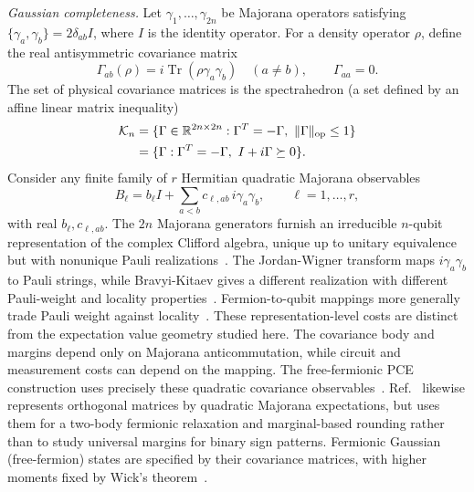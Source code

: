 \documentclass[10pt,aps,pra,twocolumn,superscriptaddress,nofootinbib,longbibliography]{revtex4-2}
\newcommand{\Tr}{\operatorname{Tr}}
\newcommand{\R}{\mathbb{R}}
\newcommand{\op}{\mathrm{op}}
\newcommand{\calK}{\mathcal{K}}
\begin{document}
\emph{Gaussian completeness.}
Let $\gamma_1,\ldots,\gamma_{2n}$ be Majorana operators satisfying $\{\gamma_a,\gamma_b\}=2\delta_{ab}I$, where $I$ is the identity operator.  For a density operator $\rho$, define the real antisymmetric covariance matrix
\begin{equation}
    \Gamma_{ab}(\rho)=i\Tr(\rho\gamma_a\gamma_b)\quad(a\ne b),
    \qquad \Gamma_{aa}=0.
    \label{eq:cov}
\end{equation}
The set of physical covariance matrices is the spectrahedron (a set defined by an affine linear matrix inequality)~\cite{RamanaGoldman1995SDP,Bravyi2005Lagrangian,Wan2023MatchgateShadows}
\begin{align}
    \calK_n
    &=\{\Gamma\in\R^{2n\times2n}:\Gamma^T=-\Gamma,\ \|\Gamma\|_{\op}\le1\}\notag\\
    &=\{\Gamma:\Gamma^T=-\Gamma,\ I+i\Gamma\succeq0\}.
    \label{eq:Kn}
\end{align}
Consider any finite family of $r$ Hermitian quadratic Majorana observables
\begin{equation}
    B_\ell=b_\ell I+\sum_{a<b}c_{\ell,ab}\,i\gamma_a\gamma_b,
    \qquad \ell=1,\ldots,r,
    \label{eq:quadratic-features}
\end{equation}
with real $b_\ell,c_{\ell,ab}$.  The $2n$ Majorana generators furnish an irreducible $n$-qubit representation of the complex Clifford algebra, unique up to unitary equivalence but with nonunique Pauli realizations~\cite{BravyiKitaev2002,Bravyi2005Lagrangian}.  The Jordan-Wigner transform maps $i\gamma_a\gamma_b$ to Pauli strings, while Bravyi-Kitaev gives a different realization with different Pauli-weight and locality properties~\cite{Seeley2012BravyiKitaev}.  Fermion-to-qubit mappings more generally trade Pauli weight against locality~\cite{Jiang2020Ternary}.  These representation-level costs are distinct from the expectation value geometry studied here.  The covariance body and margins depend only on Majorana anticommutation, while circuit and measurement costs can depend on the mapping.  The free-fermionic PCE construction uses precisely these quadratic covariance observables~\cite{LizzioBosco2026SimulablePCE}.  Ref.~\cite{ZhaoRubin2024FermionicEmbeddings} likewise represents orthogonal matrices by quadratic Majorana expectations, but uses them for a two-body fermionic relaxation and marginal-based rounding rather than to study universal margins for binary sign patterns.  Fermionic Gaussian (free-fermion) states are specified by their covariance matrices, with higher moments fixed by Wick's theorem~\cite{Bravyi2005Lagrangian}.
\end{document}
